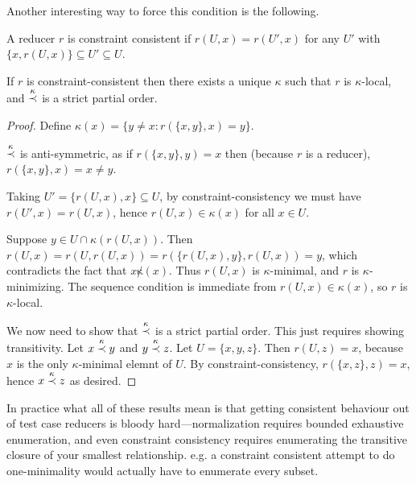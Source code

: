 Another interesting way to force this condition is the following.

\begin{definition}
A reducer \(r\) is constraint consistent if \(r(U, x) = r(U', x)\) for any \(U'\) with \(\{x, r(U, x)\} \subseteq U' \subseteq U\).
\end{definition}

\begin{theorem}
If \(r\) is constraint-consistent then there exists a unique \(\kappa\) such that \(r\) is \(\kappa\)-local,
and \(\stackrel{\kappa}{\prec}\) is a strict partial order.
\end{theorem}

\begin{proof}
Define \(\kappa(x) = \{y \neq x: r(\{x, y\}, x) = y\}\).

\(\stackrel{\kappa}{\prec}\) is anti-symmetric,
as if \(r(\{x, y\}, y) = x\) then (because \(r\) is a reducer),
\(r(\{x, y\}, x) = x \neq y\).

Taking \(U' = \{r(U, x), x\} \subseteq U\),
by constraint-consistency we must have \(r(U', x) = r(U, x)\),
hence \(r(U, x) \in \kappa(x)\) for all \(x \in U\).

Suppose \(y \in U \cap \kappa(r(U, x))\).
Then \(r(U, x) = r(U, r(U, x)) = r(\{r(U, x), y\}, r(U, x)) = y\),
which contradicts the fact that \(x \not \kappa(x)\).
Thus \(r(U, x)\) is \(\kappa\)-minimal,
and \(r\) is \(\kappa\)-minimizing.
The sequence condition is immediate from \(r(U, x) \in \kappa(x)\),
so \(r\) is \(\kappa\)-local.

We now need to show that \(\stackrel{\kappa}{\prec}\) is a strict partial order.
This just requires showing transitivity.
Let \(x \stackrel{\kappa}{\prec} y\) and \(y \stackrel{\kappa}{\prec} z\).
Let \(U = \{x, y, z\}\).
Then \(r(U, z) = x\), because \(x\) is the only \(\kappa\)-minimal elemnt of \(U\).
By constraint-consistency,
\(r(\{x, z\}, z) = x\),
hence \(x \stackrel{\kappa}{\prec} z\) as desired.
\end{proof}

In practice what all of these results mean is that getting consistent behaviour out of test case reducers is bloody hard---normalization
requires bounded exhaustive enumeration,
and even constraint consistency requires enumerating the transitive closure of your smallest relationship.
e.g. a constraint consistent attempt to do one-minimality would actually have to enumerate every subset.
